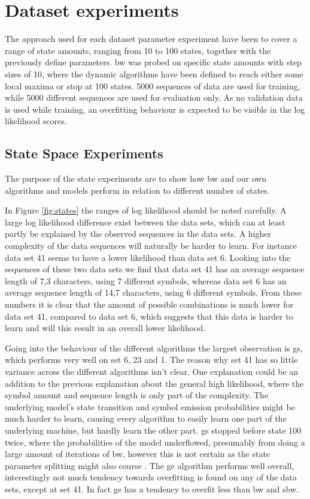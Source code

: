 \section{Dataset experiments}
\label{sec:dataset_experiments}
The approach used for each dataset parameter experiment have been to cover a range of state amounts, ranging from 10 to 100 states, together with the previously define parameters. \gls{bw} was probed on specific state amounts with step sizes of 10, where the dynamic algorithms have been defined to reach either some local maxima or stop at 100 states. 5000 sequences of data are used for training, while 5000 different sequences are used for evaluation only. As no validation data is used while training, an overfitting behaviour is expected to be visible in the log likelihood scores.

\subsection{State Space Experiments}

The purpose of the state experiments are to show how \gls{bw} and our own algorithms and models perform in relation to different number of states.

In Figure \ref{fig:states} the ranges of log likelihood should be noted carefully. A large log likelihood difference exist between the data sets, which can at least partly be explained by the observed sequences in the data sets. A higher complexity of the data sequences will naturally be harder to learn. For instance data set 41 seems to have a lower likelihood than data set 6. Looking into the sequences of these two data sets we find that data set 41 has an average sequence length of 7,3 characters, using 7 different symbols, whereas data set 6 has an average sequence length of 14,7 characters, using 6 different symbols. From these numbers it is clear that the amount of possible combinations is much lower for data set 41, compared to data set 6, which suggests that this data is harder to learn and will this result in an overall lower likelihood. 

Going into the behaviour of the different algorithms the largest observation is \gls{gs}, which performs very well on set 6, 23 and 1. The reason why set 41 has so little variance across the different algorithms isn't clear. One explanation could be an addition to the previous explanation about the general high likelihood, where the symbol amount and sequence length is only part of the complexity. The underlying model's state transition and symbol emission probabilities might be much harder to learn, causing every algorithm to easily learn one part of the underlying machine, but hardly learn the other part. \gls{gs} stopped before state 100 twice, where the probabilities of the model underflowed, presumably from doing a large amount of iterations of \gls{bw}, however this is not certain as the state parameter splitting might also course .
The \gls{ge} algorithm performs well overall, interestingly not much tendency towards overfitting is found on any of the data sets, except at set 41. In fact \gls{ge} has a tendency to overfit less than \gls{bw} and \gls{sbw}.


